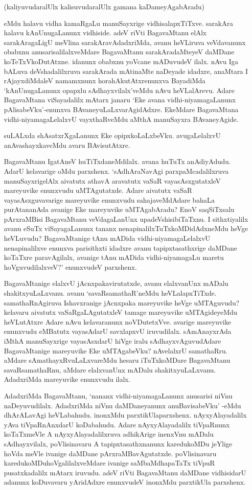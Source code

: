 (kaliyuvudaralUlx kalisuvudaralUlx gamana kaDameyAgabAradu)

eMdu halavu vidha kamaRgaLu manuSayxrige vidhisalapxTiTxve. sarakAra halavu kAnUnugaLanunx vidhiside. adeV riVti BagavaMtanu elAlx sarakAragaLigU meVlina sarakAravAdadxriMda, avanu heVLiruva veVdavanunx obabxnu anusarisalilalxveMdare BagavaMtanu sarakAradaMteyeV daMDane koTeTxVkoDutAtxne. idanunx obabxnu yoVcane mADuvudeV ilalx. nAvu Iga bALuva deVshadalilxruva sarakArada mAtinaMte naDeyade idadxre, anaMtara I rAjayxdiMdaleV namamxnunx horahAkutAtxrenunxva BayadiMda `kAnUnugaLanunx opapxlu sAdhayxvilalx'veMdu nAvu heVLalArevu. Adare BagavaMtana viSayadalilx mAtarx janaru `Eke avana vidhi-niyamagaLanunx pAlisabeVku'-enunxva BAvaneyuLaLxvarAgidAdxre. EkeMdare BagavaMtana vidhi-niyamagaLelalxvU vayxthaRveMdu aMthA manuSayxra BAvaneyAgide.

suLALxda shAsatxrXgaLanunx Eke opipxkoLaLxbeVku. avugaLelalxvU anAvashayxkaveMdu avaru BAvisutAtxre.

BagavaMtanu IgatAneV huTiTxdaneMdilalx. avana huTuTx anAdiyAdudu. AdarU kelavarige oMdu parxshenx. `sAdhAraNavAgi parxpaMcadalilxruva manuSayxrigelAlx aivatutx athavA aravatutx vaSaR vayasAsxgutatxleV mareyuvike enunxvudu uMTAgutatxde. Adare aivatutx vaSaR vayasAsxguvavarige mareyuvike enunxvudu sahajaveMdAdare bahaLa purAtananAda avanige Eke mareyuvike uMTAgabAradu? EnoV saqSiTxsalu pArxraMBisi BagavaMtanu veVdagaLanUnx upadeVshisibiTaTxnu. I sithxtiyalilx avanu eSuTx viSayagaLanunx tananx nenapinalilxTuTxkoMDidAdxneMdu heVge heVLuvudu? BagavaMtanige tAnu mADida vidhi-niyamagaLelalxvU nenapinalilxve enunxva parisithxti idadxre avanu tapipxtasathxrige daMDane koTaTxre paravAgilalx, avanige tAnu mADida vidhi-niyamagaLu maretu hoVguvudilalxveV?' enunxvudeV parxshenx.

BagavaMtanige elalxvU jAcnxpakavirutatxde, avanu elalxvanUnx mADalu shakitxyuLaLxvanu. avanu `savaRsamathaR'neMdu heVLalapxTiTxde. samathaRnAgiruva Ishavxranige jAcnxpaka mareyuvike heVge uMTAguvudu? kelavaru aivatutx vaSaRgaLAgutatxleV tamage mareyuvike uMTAgideyeMdu heVLutAtxre Adare nAvu kelavaranunx noVDutetxVve. avarige mareyuvike enunxvudu eMBatutx vayasAdarU savxlapxvU iruvudilalx. sAmAnayxrAda iMthA manuSayxrige vayasAsxdarU hiVge iralu sAdhayxvAguvudAdare BagavaMtanige mareyuvike Eke uMTAgabeVku? nAvelalxrU samathaRru. aMdare sAmathayxRvuLaLxvareMdu hesaru iTuTxkoMDare BagavaMtanu savaRsamathaRnu, aMdare elalxvanUnx mADalu shakitxyuLaLxvanu. AdadxriMda mareyuvike enunxvudu ilalx.

AdadxriMda BagavaMtanu, `nananx vidhi-niyamagaLanunx anusarisi niVnu naDeyuvudilalx. AdadxriMda niVnu daMDaneyanunx anuBavisabeVku' -eMdu dhArALavAgi heVLabahudu. inonxMdu parxtikUlaparxshenx. nAyxyAlayadalilx yAva tiVpaRnAnxdarU koDabahudu. Adare nAyxyAlayadalilx tiVpaRnunx koTaTxmeVle A nAyxyAlayadalilxruva adhikArige inenxVnu mADalu sAdhayxvilalx, poVlisinavaru A tapipxtasathxnanunx karedukoMDu jeYlige hoVda meVle ivanige daMDane pArxraMBavAgutatxde. poVlisinavaru karedukoMDuhoVgalilalxveMdare ivanige saMbaMdhapaTaTx tiVpuR pusatxkadalilx mAtarx iruvudu. adeV riVti BagavaMtanu daMDane vidhisidarU adanunx koDuvavaru yAridAdxre enunxvudeV inonxMdu parxtikUla parxshenx.

